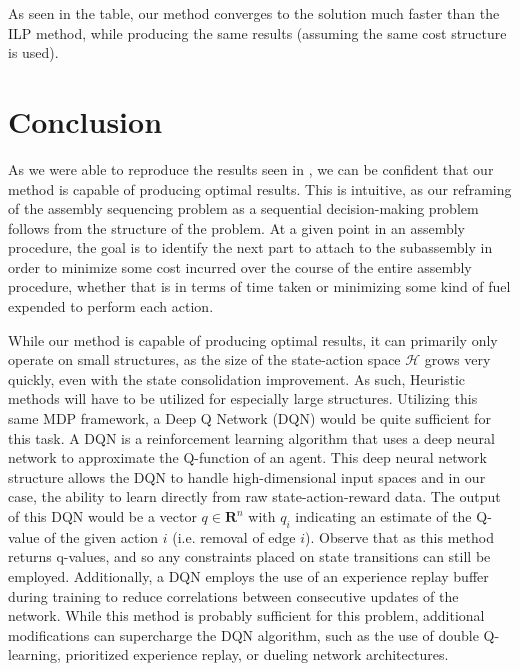 \documentclass{article}
\begin{document}
As seen in the table, our method converges to the solution much faster than the ILP method, while producing the same results (assuming the same cost structure is used).


\section{Conclusion}
As we were able to reproduce the results seen in \citet{Culbertson2019}, we can be confident that our method is capable of producing optimal results. This is intuitive, as our reframing of the assembly sequencing problem as a sequential decision-making problem follows from the structure of the problem. At a given point in an assembly procedure, the goal is to identify the next part to attach to the subassembly in order to minimize some cost incurred over the course of the entire assembly procedure, whether that is in terms of time taken or minimizing some kind of fuel expended to perform each action.

While our method is capable of producing optimal results, it can primarily only operate on small structures, as the size of the state-action space $\mathcal{H}$ grows very quickly, even with the state consolidation improvement. As such, Heuristic methods will have to be utilized for especially large structures. Utilizing this same MDP framework, a Deep Q Network (DQN) would be quite sufficient for this task. A DQN is a reinforcement learning algorithm that uses a deep neural network to approximate the Q-function of an agent. This deep neural network structure allows the DQN to handle high-dimensional input spaces and in our case, the ability to learn directly from raw state-action-reward data. The output of this DQN would be a vector $q \in \mathbf{R}^n$ with $q_i$ indicating an estimate of the Q-value of the given action $i$ (i.e. removal of edge $i$). Observe that as this method returns q-values, and so any constraints placed on state transitions can still be employed. Additionally, a DQN employs the use of an experience replay buffer during training to reduce correlations between consecutive updates of the network. While this method is probably sufficient for this problem, additional modifications can supercharge the DQN algorithm, such as the use of double Q-learning, prioritized experience replay, or dueling network architectures.


\end{document}
